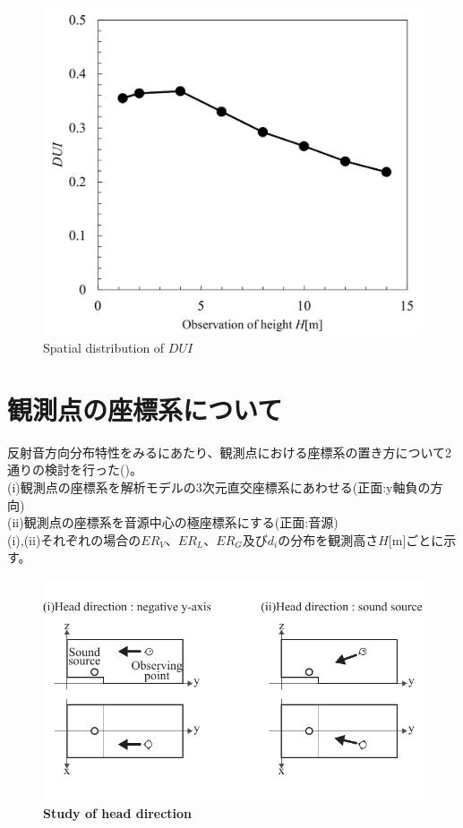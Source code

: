 \begin{figure}[p]
    \centering
    \includegraphics[keepaspectratio,scale=0.7]{05_att/DUI_abs2.pdf}
    \caption{\hspace{1mm}Spatial distribution of $DUI$}
    \label{fig:DUI_abs}
\end{figure}

\clearpage

\section{観測点の座標系について}
反射音方向分布特性をみるにあたり、観測点における座標系の置き方について2通りの検討を行った()。\\
(i)観測点の座標系を解析モデルの3次元直交座標系にあわせる(正面:y軸負の方向)\\
(ii)観測点の座標系を音源中心の極座標系にする(正面:音源)\\
(i),(ii)それぞれの場合の$ER_V$、$ER_L$、$ER_G$及び$d_i$の分布を観測高さ$H$[m]ごとに示す。

\begin{figure}[htbp]
    \centering
    \includegraphics[keepaspectratio,scale=1]{05_att/observing.pdf}
    \caption{\hspace{1mm}\textbf{Study of head direction}}
    \label{fig:observing}
\end{figure}

